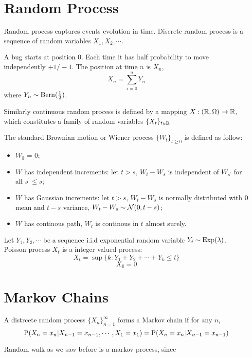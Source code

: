 \section{Random Process}
Random process captures events evolution in time. Discrete random process is a sequence of random variables $X_1, X_2,\cdots$.

\begin{exmp}{}
	A bug starts at position $0$. Each time it has half probability to move independently $+1/-1$. The position at time $n$ is $X_n$,
	$$X_n = \sum_{i=0}^n Y_n$$
	where $Y_n\sim \Bern(\frac{1}{2})$.
\end{exmp}

Similarly continuous random process is defined by a mapping $X:(\Real, \Omega) \to \Real$, which constitutes a family of random variables $\{ X_t\}_{t\in \Real}$

\begin{exmp}{}
 	The standard Brownian motion or Wiener process $\{W_t\}_{t\geq 0}$ is defined as follow:
 	\begin{itemize}
 		\item $W_0$ = 0;
 		\item $W$ has independent increments: let $t>s$, $W_t- W_s$ is independent of $W_{s^\prime}$ for all $s^\prime \leq s$;
 		\item $W$ has Gaussian increments: let $t>s$, $W_t-W_s$ is normally distributed with $0$ mean and $t-s$ variance, $W_t-W_s\sim \Nc(0, t-s)$;
 		\item $W$ has continous path, $W_t$ is continous in $t$ almost surely. 
 	\end{itemize}
\end{exmp}

\begin{exmp}{}
	Let $Y_1, Y_2, \cdots$ be a sequence i.i.d exponential random variable $Y_i \sim \Exp(\lambda)$. Poisson process $X_t$ is a integer valued process:
	$$X_t = \sup \{k: Y_1 +Y_2+\cdots+Y_k \leq t\}$$
	$$X_0 = 0$$
\end{exmp}

\section{Markov Chains}
A distrcete random process $\{X_n\}_{n=1}^\infty$ forms a Markov chain if for any $n$,
$$\P(X_n = x_n | X_{n-1} = x_{n-1}, \cdots, X_1 = x_1) = \P(X_n = x_n | X_{n-1} = x_{n-1})$$
\begin{exmp}{}
	Random walk as we saw before is a markov process, since
\end{exmp}

